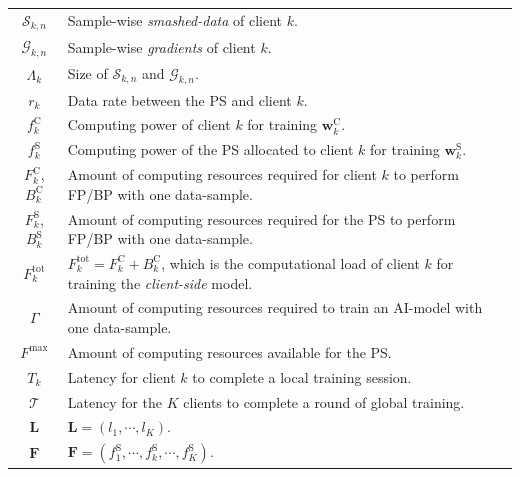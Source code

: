 \documentclass[10pt,journal,transmag]{IEEEtran}
\begin{document}
\begin{table}[!htbp]
\begin{center}
\begin{tabular}{cp{2.54in}}
        $\mathcal{S}_{k,n}$ & Sample-wise \textit{smashed-data} of client $k$. \\
        
        $\mathcal{G}_{k,n}$ & Sample-wise \textit{gradients} of client $k$. \\
        
        $\Lambda_k$ & Size of $\mathcal{S}_{k,n}$ and $\mathcal{G}_{k,n}$. \\

        $r_k$ & Data rate between the PS and client $k$. \\
        
        $f_k^\text{C}$  & Computing power of client $k$ for training 
        $\textbf{w}^\text{C}_k$. \\
        
        $f_k^\text{S}$ & Computing power of the PS allocated to client $k$ for training $\textbf{w}^\text{S}_k$.\\

        $F^\text{C}_k$, $B^\text{C}_k$ & Amount of computing resources required for client $k$ to perform FP/BP with one data-sample.\\
        
        $F^\text{S}_k$, $B^\text{S}_k$ & Amount of computing resources required for the PS to perform FP/BP with one data-sample.\\

        $F_k^\text{tot}$ & $F_k^\text{tot}=F^\text{C}_k+B^\text{C}_k$, which is the computational load of client $k$ for training the \textit{client-side} model.\\ 
        
        $\Gamma$ & Amount of computing resources required to train an AI-model with one data-sample. \\
        
        $F^{\text{max}}$ & Amount of computing resources available for the PS. \\

        $T_k$ & Latency for client $k$ to complete a local training session. \\
        
        $\mathcal{T}$ & Latency for the $K$ clients to complete a round of global training. \\
        
        $\textbf{L}$ & $\textbf{L}=(l_1, \cdots, l_K)$. \\
        
        $\textbf{F}$ & $\textbf{F}=(f^\text{S}_1, \cdots, f^\text{S}_k, \cdots, f^\text{S}_K)$. \\
        

\end{tabular}
\end{center}
\end{table}
\end{document}
